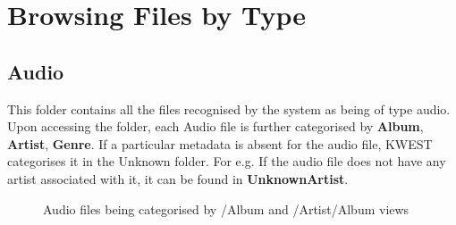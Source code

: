 \section{Browsing Files by Type}

\subsection{Audio}
This folder contains all the files recognised by the system as being of type audio. Upon accessing the folder, each Audio file is further categorised by \textbf{Album}, \textbf{Artist}, \textbf{Genre}. If a particular metadata is absent for the audio file, KWEST categorises it in the Unknown folder. \newline
For e.g. If the audio file does not have any artist associated with it, it can be found in \textbf{UnknownArtist}.
\begin{figure}[htb]
\centering
\setlength\fboxsep{0pt}
\setlength\fboxrule{0.5pt}
\caption{Audio files being categorised by /Album and /Artist/Album views}
\label{fig:dfd0}
\end{figure}

